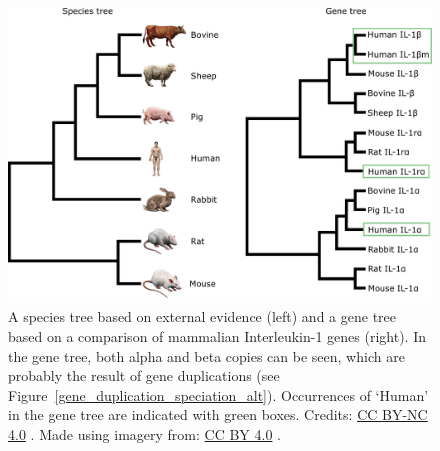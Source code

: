 
% 

\begin{figure}[!htbp]
\centering
\includegraphics[width=1\linewidth]{files/IL-tree_alt-d1fbb3f9a9055084ebcab692bcba592f.pdf}
\caption[]{A species tree based on external evidence (left) and a gene tree based on a comparison of mammalian Interleukin-1 genes (right).
In the gene tree, both alpha and beta copies can be seen, which are probably the result of gene duplications (see Figure~\ref{gene_duplication_speciation_alt}).
Occurrences of `Human' in the gene tree are indicated with green boxes.
Credits: \href{https://creativecommons.org/licenses/by-nc/4.0/}{CC BY-NC 4.0} \cite{own_3_2024}.
Made using imagery from: \href{https://creativecommons.org/licenses/by/4.0/}{CC BY 4.0} \cite{DBCLS_2021}.}
\label{IL_tree_alt}
\end{figure}

